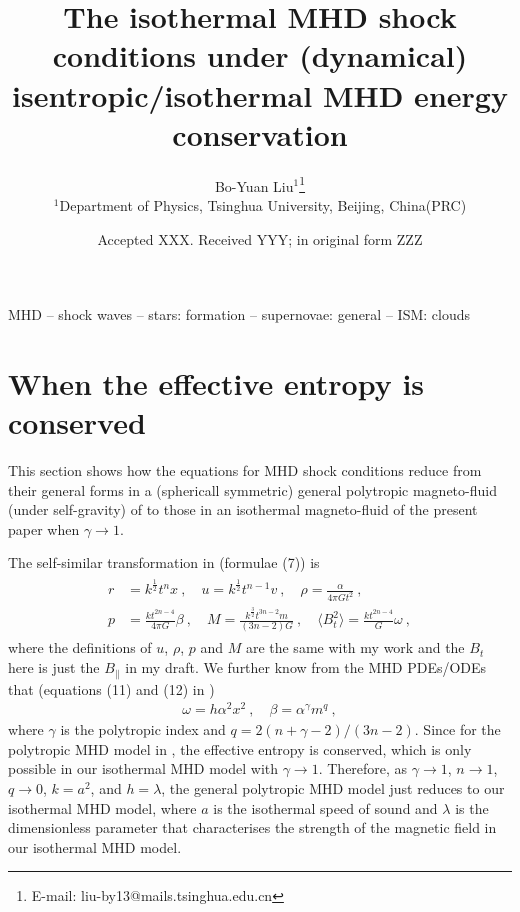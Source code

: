 \documentclass[fleqn,usenatbib]{mnras}
\title[Report on August 16]{The isothermal MHD shock conditions under (dynamical) isentropic/isothermal MHD energy conservation}
\author[Bo-Yuan Liu]{Bo-Yuan Liu$^{1}$\thanks{E-mail: liu-by13@mails.tsinghua.edu.cn}
\\
$^{1}$Department of Physics, Tsinghua University, Beijing, China(PRC)\\
}
\date{Accepted XXX. Received YYY; in original form ZZZ}
\begin{document}
\label{firstpage}
\pagerange{\pageref{firstpage}--\pageref{lastpage}}
\maketitle
\begin{keywords}
MHD -- shock waves -- stars: formation -- supernovae: general -- ISM: clouds
\end{keywords}



 
\section{When the effective entropy is conserved}
This section shows how the equations for MHD shock conditions reduce from their general forms in a (sphericall symmetric) general polytropic magneto-fluid (under self-gravity) of \citet{wang2008dynamic} to those in an isothermal magneto-fluid of the present paper when $\gamma\rightarrow 1$.

The self-similar transformation in \citet{wang2008dynamic} (formulae (7)) is
\begin{gather}
\begin{split}
r&=k^{\frac{1}{2}}t^{n}x\ ,\quad u=k^{\frac{1}{2}}t^{n-1}v\ ,\quad \rho=\frac{\alpha}{4\pi Gt^{2}}\ ,\\
p&=\frac{kt^{2n-4}}{4\pi G}\beta\ ,\quad M=\frac{k^{\frac{3}{2}}t^{3n-2}m}{(3n-2)G}\ ,\quad \langle B^{2}_{t}\rangle=\frac{kt^{2n-4}}{G}\omega\ ,
\end{split}\label{e1}
\end{gather}
where the definitions of $u$, $\rho$, $p$ and $M$ are
the same with my work and the $B_{t}$ here is just the $B_{\parallel}$ in my draft. We further know from the MHD PDEs/ODEs that (equations (11) and (12) in \citet{wang2008dynamic}) 
\begin{gather}
\omega=h\alpha^{2}x^{2}\ ,\quad \beta=\alpha^{\gamma}m^{q}\ ,\label{e2}
\end{gather}
where $\gamma$ is the polytropic index and $q=2(n+\gamma-2)/(3n-2)$. Since for the polytropic MHD model in \citet{wang2008dynamic}, the effective entropy is conserved, which is only possible in our isothermal MHD model with $\gamma\rightarrow 1$. Therefore, as $\gamma\rightarrow 1$, $n\rightarrow 1$, $q\rightarrow 0$, $k=a^{2}$, and $h=\lambda$, the general polytropic MHD model just reduces to our isothermal MHD model, where $a$ is the isothermal speed of sound and $\lambda$ is the dimensionless parameter that characterises the strength of the magnetic field in our isothermal MHD model.
\end{document}
